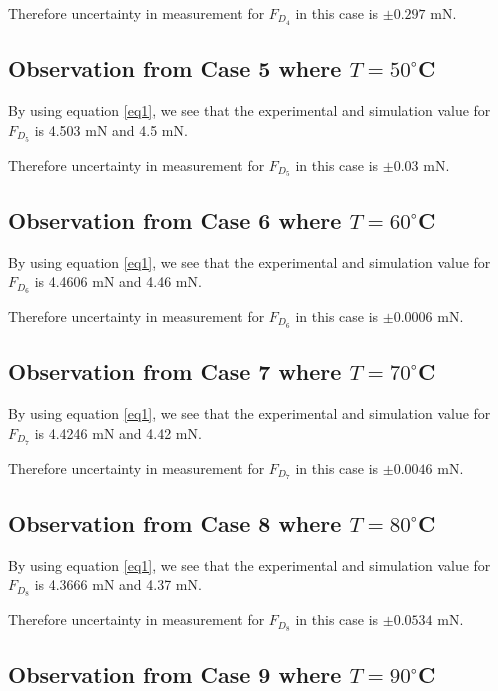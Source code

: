 	{Therefore uncertainty in measurement for $F_{D_4}$ in this case is $\pm{\textit{0.297}}$ mN.}       
        
\subsection{{Observation from Case 5 where $T = 50^\circ$C}}

	{By using equation \ref{eq1}, we see that the experimental and simulation value for $F_{D_5}$ is 4.503 mN and 4.5 mN.}
        
	{Therefore uncertainty in measurement for $F_{D_5}$ in this case is $\pm{\textit{0.03}}$ mN.}        
        
\subsection{{Observation from Case 6 where $T = 60^\circ$C}}
        
	{By using equation \ref{eq1}, we see that the experimental and simulation value for $F_{D_6}$ is 4.4606 mN and 4.46 mN.}
        
	{Therefore uncertainty in measurement for $F_{D_6}$ in this case is $\pm{\textit{0.0006}}$ mN.}
        
\subsection{{Observation from Case 7 where $T = 70^\circ$C}}
        
	{By using equation \ref{eq1}, we see that the experimental and simulation value for $F_{D_7}$ is 4.4246 mN and 4.42 mN.}
        
	{Therefore uncertainty in measurement for $F_{D_7}$ in this case is $\pm{\textit{0.0046}}$ mN.}
        
\subsection{{Observation from Case 8 where $T = 80^\circ$C}}

	{By using equation \ref{eq1}, we see that the experimental and simulation value for $F_{D_8}$ is 4.3666 mN and 4.37 mN.}
        
	{Therefore uncertainty in measurement for $F_{D_8}$ in this case is $\pm{\textit{0.0534}}$ mN.}        
                
\subsection{{Observation from Case 9 where $T = 90^\circ$C}}
        
